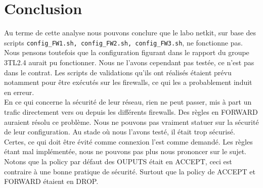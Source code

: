 \documentclass[11pt,a4paper]{article}
\begin{document}
\section{Conclusion}
Au terme de cette analyse nous pouvons conclure que le labo netkit, sur base des scripts \texttt{config\_FW1.sh, config\_FW2.sh, config\_FW3.sh}, ne fonctionne pas. Nous pensons toutefois que la configuration figurant dans le rapport du groupe 3TL2.4 aurait pu fonctionner. Nous ne l'avons cependant pas testée, ce n'est pas dans le contrat. Les scripts de validations qu'ils ont réalisés étaient prévu notamment pour être exécutés sur les firewalls, ce qui les a probablement induit en erreur. \\

En ce qui concerne la sécurité de leur réseau, rien ne peut passer, mis à part un trafic directement vers ou depuis les différents firewalls. Des règles en FORWARD auraient résolu ce problème. Nous ne pouvons pas vraiment statuer sur la sécurité de leur configuration. Au stade où nous l'avons testé, il était trop sécurisé. Certes, ce qui doit être évité comme connexion l'est comme demandé. Les règles étant mal implémentée, nous ne pouvons pas plus nous prononcer sur le sujet.
Notons que la policy par défaut des OUPUTS était en ACCEPT, ceci est contraire à une bonne pratique de sécurité. Surtout que la policy de ACCEPT et FORWARD étaient en DROP.
\end{document}
